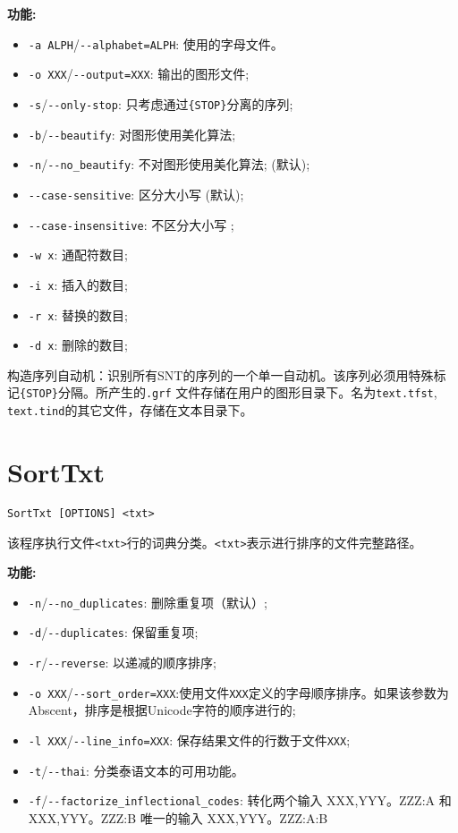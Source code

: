\bigskip
\noindent \textbf{功能:}

\begin{itemize}
  \item \verb+-a ALPH+/\verb+--alphabet=ALPH+: 使用的字母文件。
  \item \verb+-o XXX+/\verb+--output=XXX+: 输出的图形文件;
  \item \verb+-s+/\verb+--only-stop+: 只考虑通过\verb+{STOP}+分离的序列;
  \item \verb+-b+/\verb+--beautify+: 对图形使用美化算法;
  \item \verb+-n+/\verb+--no_beautify+: 不对图形使用美化算法; (默认);
  \item \verb+--case-sensitive+: 区分大小写 (默认);
  \item \verb+--case-insensitive+: 不区分大小写 ;
  \item \verb+-w x+: 通配符数目;
  \item \verb+-i x+: 插入的数目;
  \item \verb+-r x+: 替换的数目;
  \item \verb+-d x+: 删除的数目;
\end{itemize}

\bigskip
\noindent 构造序列自动机：识别所有SNT的序列的一个单一自动机。该序列必须用特殊标记\verb+{STOP}+分隔。所产生的\verb+.grf+ 文件存储在用户的图形目录下。名为\verb+text.tfst+, \verb+text.tind+的其它文件，存储在文本目录下。

\section{SortTxt}

\verb+SortTxt [OPTIONS] <txt>+

\bigskip
\noindent 该程序执行文件\verb+<txt>+行的词典分类。\verb+<txt>+表示进行排序的文件完整路径。


\bigskip
\noindent \textbf{功能:}
\begin{itemize}
\item \verb+-n+/\verb+--no_duplicates+: 删除重复项（默认）;

\item \verb+-d+/\verb+--duplicates+: 保留重复项;

\item \verb+-r+/\verb+--reverse+: 以递减的顺序排序;

\item \verb+-o XXX+/\verb+--sort_order=XXX+:使用文件\verb+XXX+定义的字母顺序排序。如果该参数为Abscent，排序是根据Unicode字符的顺序进行的;

\item \verb+-l XXX+/\verb+--line_info=XXX+: 保存结果文件的行数于文件\verb+XXX+;
  
\item \verb+-t+/\verb+--thai+: 分类泰语文本的可用功能。
\item \verb+-f+/\verb+--factorize_inflectional_codes+: 转化两个输入 XXX,YYY。ZZZ:A 和XXX,YYY。ZZZ:B 唯一的输入 XXX,YYY。ZZZ:A:B
\end{itemize}

